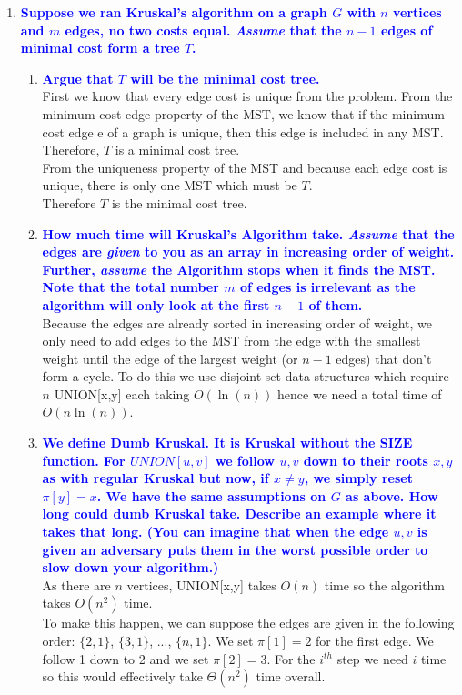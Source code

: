 \documentclass[11pt]{article}
\begin{document}
\begin{enumerate}
\item \textbf{\textcolor{blue}{Suppose we ran Kruskal's algorithm on a graph $G$ with $n$ vertices and $m$ edges, no two costs equal. {\em Assume} that the $n-1$ edges of minimal cost form a tree $T$.}}
\begin{enumerate}
    \item \textbf{\textcolor{blue}{Argue that $T$ will be the minimal cost tree.}}
        \\ First we know that every edge cost is unique from the problem. From the minimum-cost edge property of the MST, we know that if the minimum cost edge e of a graph is unique, then this edge is included in any MST. Therefore, $T$ is a minimal cost tree.
        \\ From the uniqueness property of the MST and because each edge cost is unique, there is only one MST which must be $T$.
        \\ Therefore $T$ is the minimal cost tree.
    \item \textbf{\textcolor{blue}{How much time will Kruskal's Algorithm take. {\em Assume} that the edges are {\em given} to you as an array in increasing order of weight. Further, {\em assume} the Algorithm stops when it finds the MST. Note that the total number $m$ of edges is irrelevant as the algorithm will only look at the first $n-1$ of them.}}
        \\ Because the edges are already sorted in increasing order of weight, we only need to add edges to the MST from the edge with the smallest weight until the edge of the largest weight (or $n-1$ edges) that don't form a cycle. To do this we use disjoint-set data structures which require $n$ UNION[x,y] each taking $O(\ln(n))$ hence we need a total time of $O(n\ln(n))$.
    \item \textbf{\textcolor{blue}{We define Dumb Kruskal. It is Kruskal without the SIZE function. For $UNION[u,v]$ we follow $u,v$ down to their roots $x,y$ as with regular Kruskal but now, if $x\neq y$, we simply reset $\pi[y]=x$. We have the same assumptions on $G$ as above. How long could dumb Kruskal take. Describe an example where it takes that long. (You can imagine that when the edge $u,v$ is given an adversary puts them in the worst possible order to slow down your algorithm.)}}
        \\ As there are $n$ vertices, UNION[x,y] takes $O(n)$ time so the algorithm takes $O(n^2)$ time.
        \\ To make this happen, we can suppose the edges are given in the following order: $\{2,1\}$, $\{3,1\}$, ..., $\{n,1\}$.
        We set $\pi[1] = 2$ for the first edge. We follow 1 down to 2 and we set $\pi[2] = 3$. For the $i^{th}$ step we need $i$ time so this would effectively take $\Theta(n^2)$ time overall.
\end{enumerate}


\end{enumerate}
\end{document}

